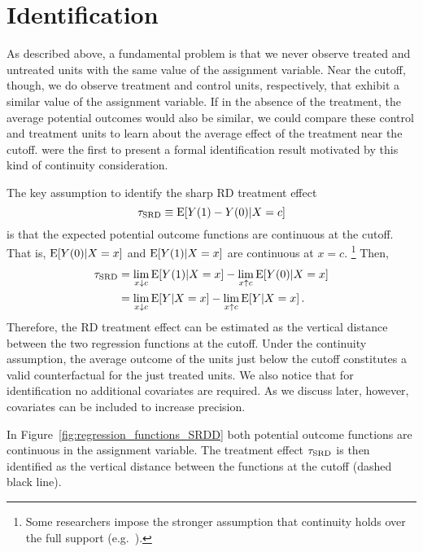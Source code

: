 


\section{Identification} \label{sec:identification}

As described above, a fundamental problem is that we never observe treated and untreated units with the same value of the assignment variable.
Near the cutoff, though, we do observe treatment and control units, respectively, that exhibit a similar value of the assignment variable.
If in the absence of the treatment, the average potential outcomes would also be similar, we could compare these control and treatment units to learn about the average effect of the treatment near the cutoff.
\textcite{Hahn_2001} were the first to present a formal identification result motivated by this kind of continuity consideration. 

The key assumption to identify the sharp RD treatment effect
\begin{equation}
\tau_{\textup{SRD}} \equiv \operatorname{E}[Y(1) - Y(0) | X = c]
\end{equation}
is that the expected potential outcome functions are continuous at the cutoff.
That is, $\operatorname{E}[Y(0) | X = x]$ and $\operatorname{E}[Y(1) | X = x]$ are continuous at $x = c$.%
\footnote{Some researchers impose the stronger assumption that continuity holds over the full support (e.g.\ \cite{Imbens_2008}).}
Then, 
\begin{align}
	\tau_{\textup{SRD}} &= \lim_{x \downarrow c} \operatorname{E}[Y(1) | X = x] - \lim_{x \uparrow c} \operatorname{E}[Y(0) | X = x] \\
	&= \lim_{x \downarrow c} \operatorname{E}[Y | X = x] - \lim_{x \uparrow c} \operatorname{E}[Y | X = x] \,.
\end{align}
Therefore, the RD treatment effect can be estimated as the vertical distance between the two regression functions at the cutoff.
Under the continuity assumption, the average outcome of the units just below the cutoff constitutes a valid counterfactual for the just treated units.  
We also notice that for identification no additional covariates are required.
As we discuss later, however, covariates can be included to increase precision.

In Figure~\ref{fig:regression_functions_SRDD} both potential outcome functions are continuous in the assignment variable.
The treatment effect $\tau_{\textup{SRD}}$ is then identified as the vertical distance between the functions at the cutoff (dashed black line).

